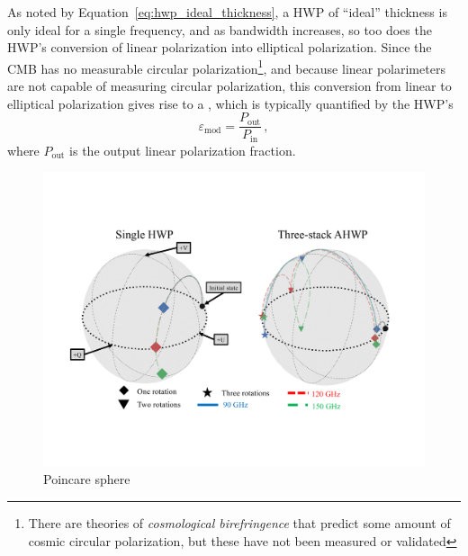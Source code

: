As noted by Equation~\ref{eq:hwp_ideal_thickness}, a HWP of ``ideal'' thickness is only ideal for a single frequency, and as bandwidth increases, so too does the HWP's conversion of linear polarization into elliptical polarization. Since the CMB has no measurable circular polarization\footnote{There are theories of \textit{cosmological birefringence} that predict some amount of cosmic circular polarization, but these have not been measured or validated}, and because linear polarimeters are not capable of measuring circular polarization, this conversion from linear to elliptical polarization gives rise to a , which is typically quantified by the HWP's 
\begin{equation}
    \varepsilon_{\mathrm{mod}} = \frac{P_{\mathrm{out}}}{P_{\mathrm{in}}} \, ,
    \label{eq:linear_polarization_modulation_efficiency}
\end{equation}
where $P_{\mathrm{out}}$ is the output linear polarization fraction.

\begin{figure}[!t]
    \centering
    \includegraphics[width=\linewidth, trim=2cm 4cm 2cm 4cm, clip]{PolarizationModulation/Figures/poincare_sphere.pdf}
    \caption{Poincare sphere}
    \label{fig:poincare_sphere}
\end{figure}


